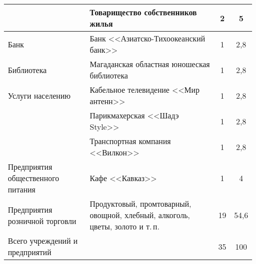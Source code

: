 \begin{table}[h!]
\begin{changemargin}{-1cm}{-1cm}
\begin{tabular}{p{5cm}p{7cm}cc}
  \cmidrule(r){2-4}                                      & Товарищество 				собственников жилья                                                                                                                      & 2               & 5               \\ \midrule
Банк                                    & Банк 				<<Азиатско-Тихоокеанский банк>>                                                                                                                    & 1               & 2,8               \\ \midrule
Библиотека                              & Магаданская 				областная юношеская библиотека                                                                                                            & 1               & 2,8               \\ \midrule
Услуги 				населению                    & Кабельное 				телевидение <<Мир антенн>>                                                                                                                    & 1               & 2,8               \\
  \cmidrule(r){2-4}                                      & Парикмахерская 				<<Шадэ Style>>                                                                                                                           & 1               & 2,8               \\
  \cmidrule(r){2-4}                                      & Транспортная 				компания <<Вилкон>>                                                                                                                        & 1               & 2,8               \\ \midrule
Предприятия 				общественного питания   &  Кафе <<Кавказ>>                                                                                                                     & 1               & 4               \\ \midrule
Предприятия 				розничной торговли      & Продуктовый, 				промтоварный, овощной, хлебный, 				алкоголь, цветы, золото и т.\,п.                                                                       & 19              & 54,6              \\  \bottomrule
                Всего учреждений и предприятий                        &                                                                                                                             & 35              & 100\\


                                        \bottomrule
\end{tabular}
\end{changemargin}
\end{table}
